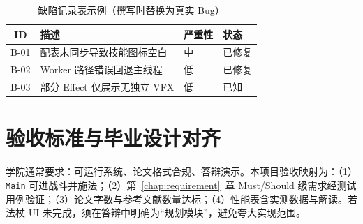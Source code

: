 \begin{table}[htbp]
  \centering
  \caption{缺陷记录表示例（撰写时替换为真实 Bug）}
  \begin{tabular}{clll}
    \toprule
    ID & 描述 & 严重性 & 状态 \\
    \midrule
    B-01 & 配表未同步导致技能图标空白 & 中 & 已修复 \\
    B-02 & Worker 路径错误回退主线程 & 低 & 已修复 \\
    B-03 & 部分 Effect 仅展示无独立 VFX & 低 & 已知 \\
    \bottomrule
  \end{tabular}
\end{table}

\section{验收标准与毕业设计对齐}

学院通常要求：可运行系统、论文格式合规、答辩演示。本项目验收映射为：（1）\texttt{Main} 可进战斗并施法；（2）第~\ref{chap:requirement}~章 Must/Should 级需求经测试用例验证；（3）论文字数与参考文献数量达标；（4）性能表含实测数据与解读。若法杖 UI 未完成，须在答辩中明确为“规划模块”，避免夸大实现范围。
